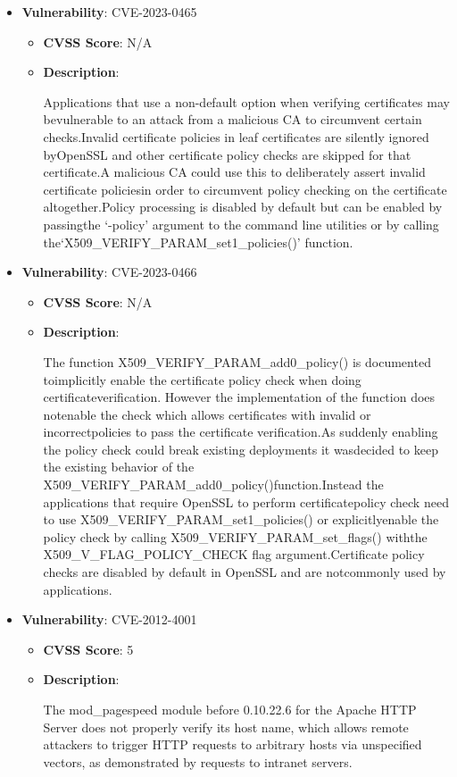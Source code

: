 \documentclass{article}
\begin{document}
\begin{itemize}
        \item \textbf{Vulnerability}: CVE-2023-0465
        \begin{itemize}
            \item \textbf{CVSS Score}:  N/A 
            \item \textbf{Description}:
            \parbox[t]{0.9\linewidth}{
                \ttfamily Applications that use a non-default option when verifying certificates may bevulnerable to an attack from a malicious CA to circumvent certain checks.Invalid certificate policies in leaf certificates are silently ignored byOpenSSL and other certificate policy checks are skipped for that certificate.A malicious CA could use this to deliberately assert invalid certificate policiesin order to circumvent policy checking on the certificate altogether.Policy processing is disabled by default but can be enabled by passingthe `-policy' argument to the command line utilities or by calling the`X509\_VERIFY\_PARAM\_set1\_policies()' function.
            }
        \end{itemize}
    
        \item \textbf{Vulnerability}: CVE-2023-0466
        \begin{itemize}
            \item \textbf{CVSS Score}:  N/A 
            \item \textbf{Description}:
            \parbox[t]{0.9\linewidth}{
                \ttfamily The function X509\_VERIFY\_PARAM\_add0\_policy() is documented toimplicitly enable the certificate policy check when doing certificateverification. However the implementation of the function does notenable the check which allows certificates with invalid or incorrectpolicies to pass the certificate verification.As suddenly enabling the policy check could break existing deployments it wasdecided to keep the existing behavior of the X509\_VERIFY\_PARAM\_add0\_policy()function.Instead the applications that require OpenSSL to perform certificatepolicy check need to use X509\_VERIFY\_PARAM\_set1\_policies() or explicitlyenable the policy check by calling X509\_VERIFY\_PARAM\_set\_flags() withthe X509\_V\_FLAG\_POLICY\_CHECK flag argument.Certificate policy checks are disabled by default in OpenSSL and are notcommonly used by applications.
            }
        \end{itemize}
    
        \item \textbf{Vulnerability}: CVE-2012-4001
        \begin{itemize}
            \item \textbf{CVSS Score}:  5 
            \item \textbf{Description}:
            \parbox[t]{0.9\linewidth}{
                \ttfamily The mod\_pagespeed module before 0.10.22.6 for the Apache HTTP Server does not properly verify its host name, which allows remote attackers to trigger HTTP requests to arbitrary hosts via unspecified vectors, as demonstrated by requests to intranet servers.
            }
        \end{itemize}
    

\end{itemize}
\end{document}
